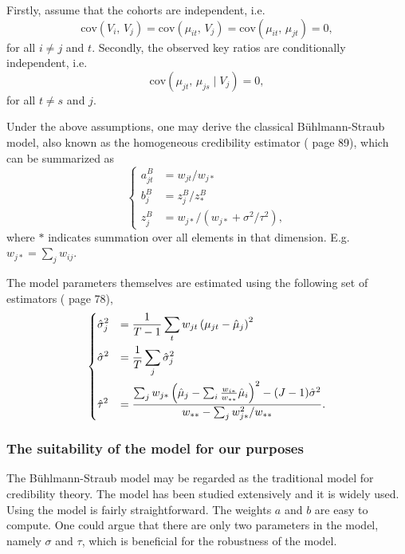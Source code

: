 \documentclass[11pt]{article}
\theoremstyle{definition}
\begin{document}
Firstly, assume that the cohorts are independent, i.e.\
\begin{equation}\label{eq:buhlmann_indep_risks}
    \text{cov}(V_i,\, V_j) = \text{cov}(\mu_{it},\, V_j) = \text{cov}(\mu_{it},\, \mu_{jt}) = 0,
\end{equation}
 for all $i \neq j$ and $t$. Secondly, the observed key ratios are conditionally independent, i.e.\
 \begin{equation}\label{eq:buhlmann_indep_obs}
     \text{cov}(\mu_{jt},\, \mu_{js}\mid V_j)=0,
 \end{equation}
for all $t \neq s$ and $j$.

Under the above assumptions, one may derive the classical Bühlmann-Straub model, also known as the homogeneous credibility estimator (\cite{buhlmann} page 89), which can be summarized as
\begin{equation}\label{eq:buhlmann}
    \begin{cases}
        a_{jt}^B &= w_{jt} / w_{j\ast} \\
        b_j^B &= z_j^B / z_\ast^B  \\
        z_j^B &= w_{j\ast} / (w_{j\ast} + \sigma^2/\tau^2),
    \end{cases}
\end{equation}
where $\ast$ indicates summation over all elements in that dimension. E.g.\ $w_{j\ast} = \sum_j w_{ij}$.

The model parameters themselves are estimated using the following set of estimators (\cite{esbjorn} page 78),
\begin{equation}\label{eq:buhlmann_estimators}
    \begin{dcases}
        \hat\sigma_j^2 &= \frac{1}{T-1}\sum_t w_{jt}\left(\mu_{jt}-\hat\mu_j\right)^2 \\
        \hat\sigma^2 &= \frac{1}{T}\sum_j \hat\sigma_j^2\\
        \hat\tau^2 &= \frac{\sum_j w_{j\ast}\left(\hat\mu_j - \sum_i \frac{w_{i\ast}}{w_{\ast\ast}}\hat\mu_i \right)^2-(J-1)\hat\sigma^2}{w_{\ast\ast}-\sum_j w_{j\ast}^2/w_{\ast\ast}}.
    \end{dcases}
\end{equation}

\subsubsection*{The suitability of the model for our purposes}
The Bühlmann-Straub model may be regarded as the traditional model for credibility theory. The model has been studied extensively and it is widely used. Using the model is fairly straightforward. The weights $a$ and $b$ are easy to compute. One could argue that there are only two parameters in the model, namely $\sigma$ and $\tau$, which is beneficial for the robustness of the model.
\end{document}
